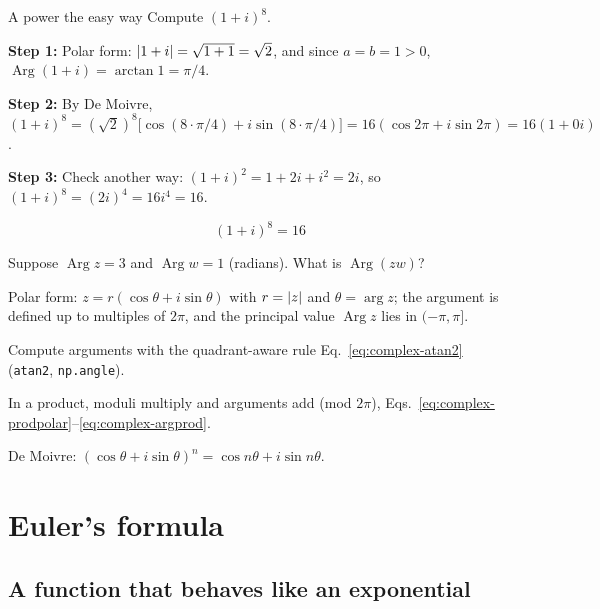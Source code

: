\begin{sample}{A power the easy way}
Compute $(1+i)^8$.

\textbf{Step 1:} Polar form: $\left\lvert 1+i\right\rvert=\sqrt{1+1}=\sqrt2$, and since $a=b=1>0$, $\operatorname{Arg}(1+i)=\arctan1=\pi/4$.

\textbf{Step 2:} By De Moivre, $(1+i)^8=(\sqrt2)^8\bigl[\cos(8\cdot\pi/4)+i\sin(8\cdot\pi/4)\bigr]=16(\cos2\pi+i\sin2\pi)=16(1+0i)$.

\textbf{Step 3:} Check another way: $(1+i)^2=1+2i+i^2=2i$, so $(1+i)^8=(2i)^4=16i^4=16$.

\[
\boxed{(1+i)^8=16}
\]
\end{sample}

\begin{checkpoint}
Suppose $\operatorname{Arg}z=3$ and $\operatorname{Arg}w=1$ (radians). What is $\operatorname{Arg}(zw)$?
\end{checkpoint}

\begin{keyideas}
\item Polar form: $z=r(\cos\theta+i\sin\theta)$ with $r=\left\lvert z\right\rvert$ and $\theta=\arg z$; the argument is defined up to multiples of $2\pi$, and the principal value $\operatorname{Arg}z$ lies in $(-\pi,\pi]$.
\item Compute arguments with the quadrant-aware rule Eq.~\eqref{eq:complex-atan2} (\texttt{atan2}, \texttt{np.angle}).
\item In a product, moduli multiply and arguments add (mod $2\pi$), Eqs.~\eqref{eq:complex-prodpolar}--\eqref{eq:complex-argprod}.
\item De Moivre: $(\cos\theta+i\sin\theta)^n=\cos n\theta+i\sin n\theta$.
\end{keyideas}

\section{Euler's formula}\label{sec:complex-euler}

\subsection{A function that behaves like an exponential}

